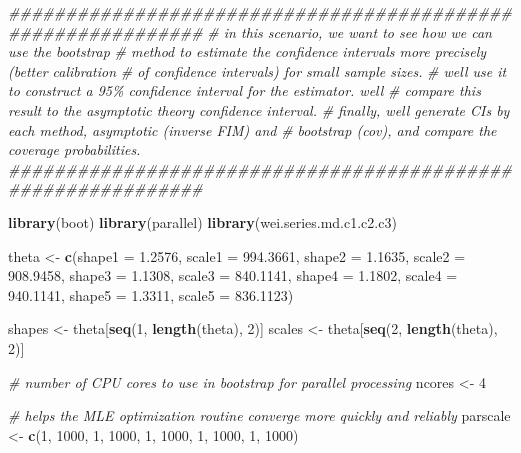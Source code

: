 \documentclass[
]{article}
\newenvironment{Shaded}{\begin{snugshade}}{\end{snugshade}}
\newcommand{\CommentTok}[1]{\textcolor[rgb]{0.56,0.35,0.01}{\textit{#1}}}
\newcommand{\DataTypeTok}[1]{\textcolor[rgb]{0.13,0.29,0.53}{#1}}
\newcommand{\DecValTok}[1]{\textcolor[rgb]{0.00,0.00,0.81}{#1}}
\newcommand{\FloatTok}[1]{\textcolor[rgb]{0.00,0.00,0.81}{#1}}
\newcommand{\KeywordTok}[1]{\textcolor[rgb]{0.13,0.29,0.53}{\textbf{#1}}}
\newcommand{\NormalTok}[1]{#1}
\newcommand{\StringTok}[1]{\textcolor[rgb]{0.31,0.60,0.02}{#1}}
\begin{document}
\begin{Shaded}
\begin{Highlighting}[]
\CommentTok{\#\#\#\#\#\#\#\#\#\#\#\#\#\#\#\#\#\#\#\#\#\#\#\#\#\#\#\#\#\#\#\#\#\#\#\#\#\#\#\#\#\#\#\#\#\#\#\#\#\#\#\#\#\#\#\#\#\#\#\#\#}
\CommentTok{\# in this scenario, we want to see how we can use the bootstrap}
\CommentTok{\# method to estimate the confidence intervals more precisely (better calibration}
\CommentTok{\# of confidence intervals) for small sample sizes.}
\CommentTok{\# we\textquotesingle{}ll use it to construct a 95\% confidence interval for the estimator. we\textquotesingle{}ll}
\CommentTok{\# compare this result to the asymptotic theory confidence interval.}
\CommentTok{\# finally, we\textquotesingle{}ll generate CIs by each method, asymptotic (inverse FIM) and }
\CommentTok{\# bootstrap (cov), and compare the coverage probabilities.}
\CommentTok{\#\#\#\#\#\#\#\#\#\#\#\#\#\#\#\#\#\#\#\#\#\#\#\#\#\#\#\#\#\#\#\#\#\#\#\#\#\#\#\#\#\#\#\#\#\#\#\#\#\#\#\#\#\#\#\#\#\#\#\#\#}

\KeywordTok{library}\NormalTok{(boot)}
\KeywordTok{library}\NormalTok{(parallel)}
\KeywordTok{library}\NormalTok{(wei.series.md.c1.c2.c3)}

\NormalTok{theta \textless{}{-}}\StringTok{ }\KeywordTok{c}\NormalTok{(}\DataTypeTok{shape1 =} \FloatTok{1.2576}\NormalTok{, }\DataTypeTok{scale1 =} \FloatTok{994.3661}\NormalTok{,}
           \DataTypeTok{shape2 =} \FloatTok{1.1635}\NormalTok{, }\DataTypeTok{scale2 =} \FloatTok{908.9458}\NormalTok{,}
           \DataTypeTok{shape3 =} \FloatTok{1.1308}\NormalTok{, }\DataTypeTok{scale3 =} \FloatTok{840.1141}\NormalTok{,}
           \DataTypeTok{shape4 =} \FloatTok{1.1802}\NormalTok{, }\DataTypeTok{scale4 =} \FloatTok{940.1141}\NormalTok{,}
           \DataTypeTok{shape5 =} \FloatTok{1.3311}\NormalTok{, }\DataTypeTok{scale5 =} \FloatTok{836.1123}\NormalTok{)}

\NormalTok{shapes \textless{}{-}}\StringTok{ }\NormalTok{theta[}\KeywordTok{seq}\NormalTok{(}\DecValTok{1}\NormalTok{, }\KeywordTok{length}\NormalTok{(theta), }\DecValTok{2}\NormalTok{)]}
\NormalTok{scales \textless{}{-}}\StringTok{ }\NormalTok{theta[}\KeywordTok{seq}\NormalTok{(}\DecValTok{2}\NormalTok{, }\KeywordTok{length}\NormalTok{(theta), }\DecValTok{2}\NormalTok{)]}

\CommentTok{\# number of CPU cores to use in bootstrap for parallel processing}
\NormalTok{ncores \textless{}{-}}\StringTok{ }\DecValTok{4}

\CommentTok{\# helps the MLE optimization routine converge more quickly and reliably}
\NormalTok{parscale \textless{}{-}}\StringTok{ }\KeywordTok{c}\NormalTok{(}\DecValTok{1}\NormalTok{, }\DecValTok{1000}\NormalTok{, }\DecValTok{1}\NormalTok{, }\DecValTok{1000}\NormalTok{, }\DecValTok{1}\NormalTok{, }\DecValTok{1000}\NormalTok{, }\DecValTok{1}\NormalTok{, }\DecValTok{1000}\NormalTok{, }\DecValTok{1}\NormalTok{, }\DecValTok{1000}\NormalTok{)}


\end{Highlighting}
\end{Shaded}
\end{document}
